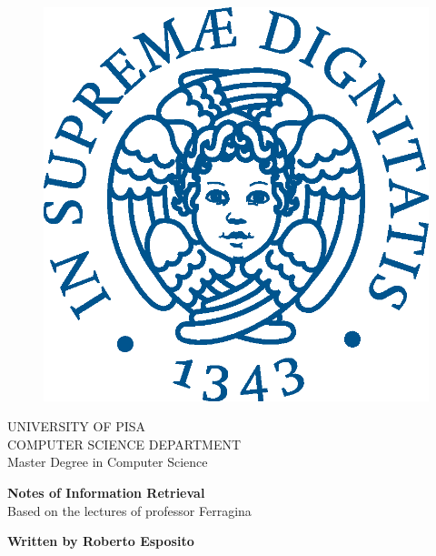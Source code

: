 \begin{titlepage}
\begin{figure}[!htb]
    \centering
    \includegraphics[keepaspectratio=true,scale=0.5]{cherubino_pant541.eps}
\end{figure}

\begin{center}
    \LARGE{UNIVERSITY OF PISA}
    \vspace{5mm}
    \\ \large{COMPUTER SCIENCE DEPARTMENT }
    \vspace{5mm}
    \\ \LARGE{Master Degree in Computer Science}
\end{center}

\vspace{15mm}
\begin{center}
    {\LARGE{\bf Notes of Information Retrieval}{\\\vspace{15mm}\small Based on the lectures of professor Ferragina}}
\end{center}
\vspace{30mm}

\begin{center}
	{\normalsize\vspace{3mm}
	\bf \large{Written by Roberto Esposito}}
\end{center}

\vspace{30mm}
\hrulefill
\\

\end{titlepage}